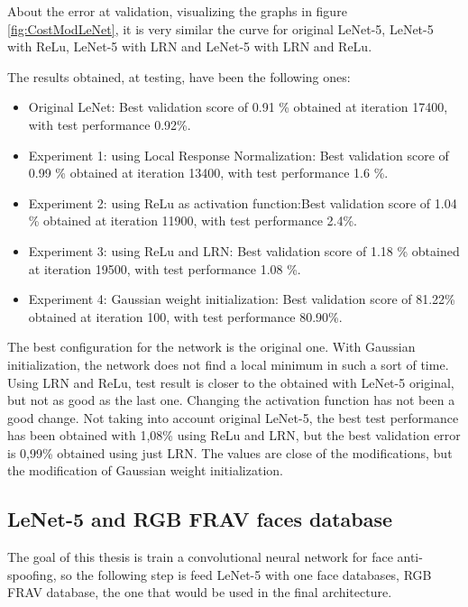 About the error at validation, visualizing the graphs in figure \ref{fig:CostModLeNet}, it is very similar the curve for original LeNet-5, LeNet-5 with ReLu, LeNet-5 with LRN and LeNet-5 with LRN and ReLu.\\
\clearpage

The results obtained, at testing, have been the following ones:

\begin{itemize}
\item{Original LeNet}: Best validation score of 0.91 \% obtained at iteration 17400, with test performance 0.92\%.
\item{Experiment 1: using Local Response Normalization}: Best validation score of 0.99 \% obtained at iteration 13400, with test performance 1.6 \%.
\item{Experiment 2: using ReLu as activation function}:Best validation score of 1.04 \% obtained at iteration 11900, with test performance 2.4\%.
\item{Experiment 3: using ReLu and LRN}: Best validation score of 1.18 \% obtained at iteration 19500, with test performance 1.08 \%.
\item{Experiment 4: Gaussian weight initialization}: Best validation score of 81.22\% obtained at iteration 100, with test performance 80.90\%.
\end{itemize}

The best configuration for the network is the original one. With Gaussian initialization, the network does not find a local minimum in such a sort of time. Using LRN and ReLu, test result is closer to the obtained with LeNet-5 original, but not as good as the last one. Changing the activation function has not been a good change. Not taking into account original LeNet-5, the best test performance has been obtained with 1,08\% using ReLu and LRN, but the best validation error is 0,99\% obtained using just LRN. The values are close of the modifications, but the modification of Gaussian weight initialization.\\

\subsection{LeNet-5 and RGB FRAV faces database}
The goal of this thesis is train a convolutional neural network for face anti-spoofing, so the following step is feed LeNet-5 with one face databases, RGB FRAV database, the one that would be used in the final architecture.\\

